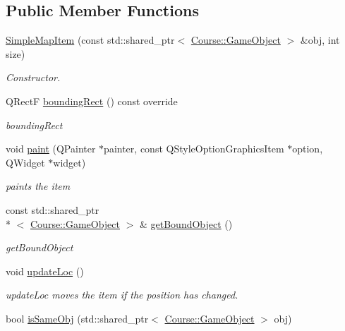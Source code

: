 \subsection*{Public Member Functions}
\begin{DoxyCompactItemize}
\item 
\hyperlink{classCourse_1_1SimpleMapItem_a3203bf5f513161593f4036320b7c24c6}{Simple\-Map\-Item} (const std\-::shared\-\_\-ptr$<$ \hyperlink{classCourse_1_1GameObject}{Course\-::\-Game\-Object} $>$ \&obj, int size)
\begin{DoxyCompactList}\small\item\em Constructor. \end{DoxyCompactList}\item 
Q\-Rect\-F \hyperlink{classCourse_1_1SimpleMapItem_ad103986c7b67b3e1c69e10291e6c4b36}{bounding\-Rect} () const override
\begin{DoxyCompactList}\small\item\em bounding\-Rect \end{DoxyCompactList}\item 
void \hyperlink{classCourse_1_1SimpleMapItem_a42f0b7bd86da05bcc511486362aabb8b}{paint} (Q\-Painter $\ast$painter, const Q\-Style\-Option\-Graphics\-Item $\ast$option, Q\-Widget $\ast$widget)
\begin{DoxyCompactList}\small\item\em paints the item \end{DoxyCompactList}\item 
const std\-::shared\-\_\-ptr\\*
$<$ \hyperlink{classCourse_1_1GameObject}{Course\-::\-Game\-Object} $>$ \& \hyperlink{classCourse_1_1SimpleMapItem_ad244bfbca3b53ec888ae7fa07b004e68}{get\-Bound\-Object} ()
\begin{DoxyCompactList}\small\item\em get\-Bound\-Object \end{DoxyCompactList}\item 
void \hyperlink{classCourse_1_1SimpleMapItem_a7b064cd8193aff3a1e810582e9e75786}{update\-Loc} ()
\begin{DoxyCompactList}\small\item\em update\-Loc moves the item if the position has changed. \end{DoxyCompactList}\item 
bool \hyperlink{classCourse_1_1SimpleMapItem_a95cc703e4962903f3a67bee4eb7c7165}{is\-Same\-Obj} (std\-::shared\-\_\-ptr$<$ \hyperlink{classCourse_1_1GameObject}{Course\-::\-Game\-Object} $>$ obj)

\end{DoxyCompactItemize}
